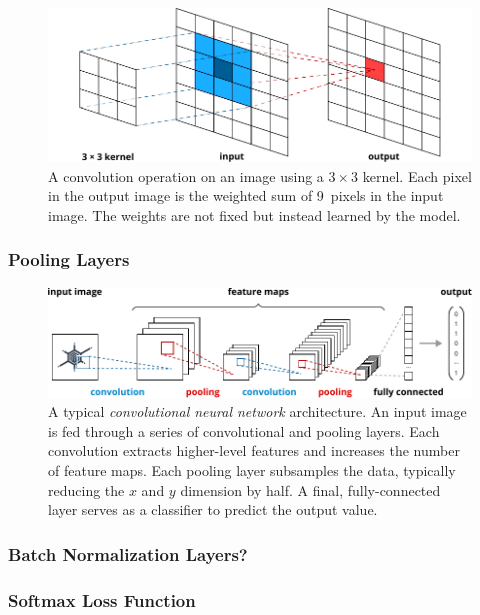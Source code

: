 	\begin{figure}[tp]
  		\centering
    	\includegraphics{img/convolution.pdf}
    	\caption{A convolution operation on an image using a $3 \times 3$ kernel. Each pixel in the output image is the weighted sum of \num{9}~pixels in the input image. The weights are not fixed but instead learned by the model.}
    	\label{fig:convolution}
	\end{figure}

\subsubsection{Pooling Layers}

	\begin{figure}[tp]
  		\centering
    	\includegraphics{img/convnet.pdf}
    	\caption{A typical \emph{convolutional neural network} architecture. An input image is fed through a series of convolutional and pooling layers. Each convolution extracts higher-level features and increases the number of feature maps. Each pooling layer subsamples the data, typically reducing the $x$ and $y$ dimension by half. A final, fully-connected layer serves as a classifier to predict the output value.}
    	\label{fig:convnet}
	\end{figure}

\subsubsection{Batch Normalization Layers?}
\subsubsection{Softmax Loss Function}
